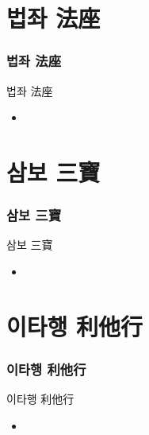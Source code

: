 \documentclass[aspectratio=1610,17pt,xcolor=pdftex,dvipsnames,table,handout]{beamer}
\begin{document}
		\section{				법좌	法座	}
		\begin{frame} [t,plain]						
		\frametitle{			법좌	法座	}
			\begin{block} { 		법좌	法座	}
			\setlength{\leftmargini}{2em}			
			\begin{itemize}
				\item 
			\end{itemize}
			\end{block}						
								
		\end{frame}						

		\section{				삼보	三寶	}
		\begin{frame} [t,plain]						
		\frametitle{			삼보	三寶	}
			\begin{block} { 		삼보	三寶	}
		\setlength{\leftmargini}{2em}			
			\begin{itemize}
				\item 
			\end{itemize}
			\end{block}						
								
		\end{frame}						

		\section{				이타행	利他行	}
		\begin{frame} [t,plain]						
		\frametitle{			이타행	利他行	}
			\begin{block} { 		이타행	利他行	}
			\setlength{\leftmargini}{2em}			
			\begin{itemize}
				\item 
			\end{itemize}
			\end{block}						
								
		\end{frame}						
\end{document}
